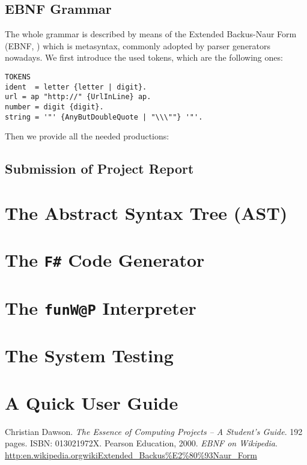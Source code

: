 \documentclass[]{final_report}
\begin{document}
\section{EBNF Grammar}

The whole grammar is described by means of the Extended Backus-Naur Form (EBNF, \cite{ebnf}) which is metasyntax, commonly adopted by parser generators nowadays. We first introduce the used tokens, which are the following ones:

\begin{lstlisting}
TOKENS
ident  = letter {letter | digit}.
url = ap "http://" {UrlInLine} ap.
number = digit {digit}.
string = '"' {AnyButDoubleQuote | "\\\""} '"'.
\end{lstlisting}

Then we provide all the needed productions:

\section{Submission of Project Report}

\chapter{\label{chapter3} The Abstract Syntax Tree (AST)}

\chapter{\label{chapter4} The \texttt{F\#} Code Generator}

\chapter{\label{chapter5} The \texttt{funW@P} Interpreter}
\chapter{\label{chapter6} The System Testing}
\chapter{\label{chapter7} A Quick User Guide}

\newpage
\begin{thebibliography}{99}
 Christian Dawson. \emph{The Essence of Computing Projects -- A Student's Guide}. 192 pages. ISBN: 013021972X. Pearson Education, 2000.
\emph{EBNF on Wikipedia}. \href{http:\/\/en.wikipedia.org\/wiki\/Extended\_Backus\%E2\%80\%93Naur\_Form}{http:\/\/en.wikipedia.org\/wiki\/Extended\_Backus\%E2\%80\%93Naur\_Form}
\end{thebibliography}
\end{document}
